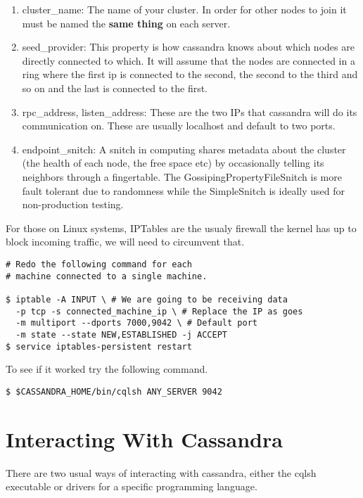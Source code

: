 \documentclass[9pt,twocolumn,twoside]{idsi}
\begin{document}
\begin{enumerate}
\item cluster\_name: The name of your cluster. In order for other nodes to join it must be named the \textbf{same thing} on each server.
\item seed\_provider: This property is how cassandra knows about which nodes are directly connected to which. It will assume that the nodes are connected in a ring where the first ip is connected to the second, the second to the third and so on and the last is connected to the first.
\item rpc\_address, listen\_address: These are the two IPs that cassandra will do its communication on. These are usually localhost and default to two ports.
\item endpoint\_snitch: A snitch in computing shares metadata about the cluster (the health of each node, the free space etc) by occasionally telling its neighbors through a fingertable. The GossipingPropertyFileSnitch is more fault tolerant due to randomness while the SimpleSnitch is ideally used for non-production testing.
\end{enumerate}

For those on Linux systems, IPTables are the usualy firewall the kernel has up to block incoming traffic, we will need to circumvent that.

\begin{lstlisting}[breaklines]
# Redo the following command for each
# machine connected to a single machine.

$ iptable -A INPUT \ # We are going to be receiving data
  -p tcp -s connected_machine_ip \ # Replace the IP as goes
  -m multiport --dports 7000,9042 \ # Default port
  -m state --state NEW,ESTABLISHED -j ACCEPT
$ service iptables-persistent restart
\end{lstlisting}

To see if it worked try the following command.

\begin{lstlisting}[breaklines]
$ $CASSANDRA_HOME/bin/cqlsh ANY_SERVER 9042
\end{lstlisting}


\section{Interacting With Cassandra}

There are two usual ways of interacting with cassandra, either the cqlsh executable or drivers for a specific programming language.
\end{document}
